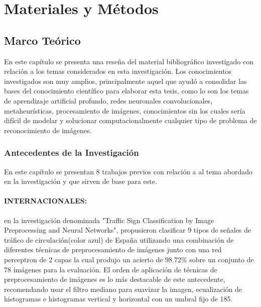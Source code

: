 \chapter{Materiales y Métodos}
\setcounter{page}{20}
\renewcommand{\baselinestretch}{1.2} %

\section{Marco Teórico} 

En este capítulo se presenta una reseña del material bibliográfico investigado con relación a los temas considerados en esta investigación. Los conocimientos investigados son muy amplios, principalmente aquel que ayudó a consolidar las bases del conocimiento científico para elaborar esta tesis, como lo son los temas de aprendizaje artificial profundo, redes neuronales convolucionales, metaheurísticas, procesamiento de imágenes, conocimientos sin los cuales sería difícil de modelar y solucionar computacionalmente cualquier tipo de problema de reconocimiento de imágenes.

\subsection{Antecedentes de la Investigación}

	En este capítulo se presentan 8 trabajos previos con relación a al tema abordado en la investigación y que sirven de base para este.
	\vskip 0.4cm

	\subsubsection
	{INTERNACIONALES:}
		\citep{VicenBueno2007} en la investigación denominada "Traffic Sign Classification by Image Preprocessing and Neural Networks", propusieron clasificar 9 tipos de señales de tráfico de circulación(color azul) de España utilizando una combinación de diferentes técnicas de preprocesamiento de imágenes junto con una red perceptron de 2 capas la cual produjo un acierto de 98.72\% sobre un conjunto de 78 imágenes para la evaluación. El orden de aplicación de técnicas de preprocesamiento de imágenes es lo más destacable de este antecedente, recomendando usar el filtro mediano para suavizar la imagen, ecualización de histogramas e histogramas vertical y horizontal con un umbral fijo de 185.
		\vskip 0.4cm


